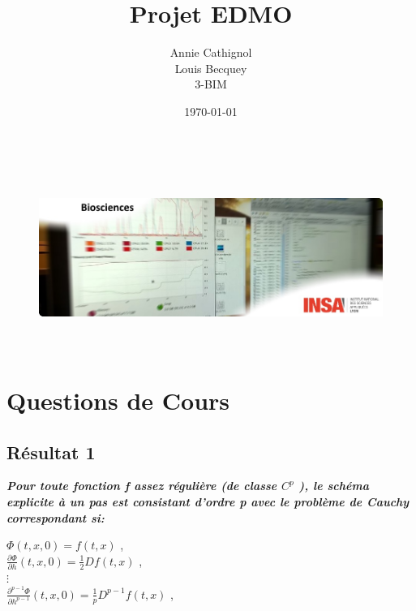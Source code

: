 \documentclass[a4paper,12pt,landscape]{article}
\begin{document}
\title{Projet EDMO}
\author{Annie Cathignol\\Louis Becquey\\3-BIM}
\date{\today}
\maketitle
\begin{figure}[h!]
\centering
\includegraphics[height=6cm]{matlabresult.png}
\end{figure}

\newpage

\section{Questions de Cours}
\subsection{Résultat 1}
{\it \bf Pour toute fonction f assez régulière (de classe $C^{p}$ ), le schéma explicite à un pas est consistant d’ordre p avec le problème de Cauchy correspondant si:}\\
\begin{center}
$\Phi (t,x,0) = f(t,x)$ ,  \\
$\frac{\partial \Phi}{\partial h} (t,x,0) = \frac{1}{2}Df(t,x)$ , \\
$\vdots$ \\
$\frac{\partial^{p-1}\Phi}{\partial h^{p-1}} (t,x,0) = \frac{1}{p}D^{p-1}f(t,x)$ , \\
\end{center}
\end{document}
